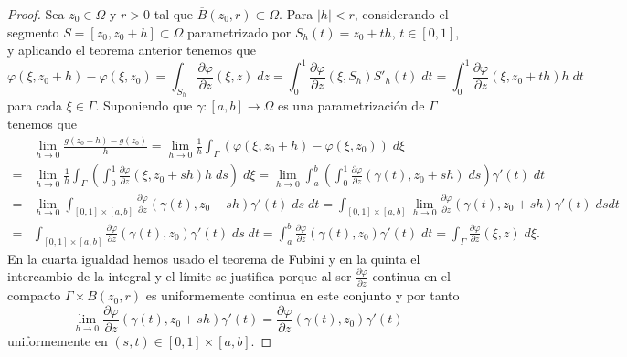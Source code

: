 \begin{proof}
	Sea $\displaystyle z_{0} \in \Omega  $ y $\displaystyle r > 0 $ tal que $\displaystyle \overline{B}\left(z_{0}, r\right)\subset \Omega  $. Para $\displaystyle \left|h\right|<r $, considerando el segmento $\displaystyle S = \left[z_{0}, z_{0} + h\right] \subset \Omega  $ parametrizado por $\displaystyle S_{h}\left(t\right)=z_{0} + th $, $\displaystyle t \in \left[0,1\right]  $, y aplicando el teorema anterior tenemos que 
	\[\varphi\left(\xi, z_{0} + h\right)-\varphi\left(\xi, z_{0}\right)=\int _{S_{h}}\frac{\partial\varphi}{\partial z}\left(\xi, z\right) \; dz = \int^{1}_{0} \frac{\partial \varphi}{\partial z}\left(\xi, S_{h}\right)S'_{h}\left(t\right) \; dt = \int^{1}_{0} \frac{\partial\varphi}{\partial z}\left(\xi,z_{0}+th\right)h \; dt \]
	para cada $\displaystyle \xi \in \Gamma $. Suponiendo que $\displaystyle \gamma : \left[a,b\right] \to \Omega  $ es una parametrización de $\displaystyle \Gamma $ tenemos que
	\[
	\begin{split}
		&\lim_{h \to 0}\frac{g\left(z_{0} + h\right)-g\left(z_{0}\right)}{h} =  \lim_{h \to 0}\frac{1}{h}\int _{\Gamma}\left(\varphi\left(\xi, z_{0} + h\right)-\varphi\left(\xi, z_{0}\right)\right) \; d\xi \\
		= &  \lim_{h \to 0}\frac{1}{h}\int _{\Gamma }\left(\int^{1}_{0} \frac{\partial\varphi}{\partial z}\left(\xi, z_{0} + sh\right)h \; d s\right) \; d\xi 
		=  \lim_{h \to 0}\int^{b}_{a} \left(\int^{1}_{0} \frac{\partial \varphi}{\partial z}\left(\gamma\left(t\right), z_{0} + sh\right) \; d s\right)\gamma'\left(t\right) \; dt \\
		= &  \lim_{h \to 0}\int _{\left[0,1\right] \times\left[a,b\right] }\frac{\partial \varphi}{\partial z}\left(\gamma\left(t\right), z_{0} + sh\right)\gamma'\left(t\right) \; d s \; dt  = \int _{\left[0,1\right] \times\left[a,b\right] }\lim_{h \to 0}\frac{\partial \varphi}{\partial z}\left(\gamma \left(t\right), z_{0} + sh\right)\gamma'\left(t\right) \; d s dt\\
		= & \int _{\left[0,1\right] \times\left[a,b\right] }\frac{\partial \varphi}{\partial z}\left(\gamma\left(t\right), z_{0}\right)\gamma'\left(t\right) \; d s \; dt = \int^{b}_{a} \frac{\partial \varphi}{\partial z}\left(\gamma\left(t\right), z_{0}\right)\gamma'\left(t\right) \; dt = \int _{\Gamma}\frac{\partial \varphi}{\partial z}\left(\xi, z\right) \; d\xi.
	\end{split}
	\]
En la cuarta igualdad hemos usado el teorema de Fubini y en la quinta el intercambio de la integral y el límite se justifica porque al ser $\displaystyle \frac{\partial \varphi}{\partial z} $ continua en el compacto $\displaystyle \Gamma \times \overline{B}\left(z_{0}, r\right) $ es uniformemente continua en este conjunto y por tanto
\[\lim_{h \to 0}\frac{\partial \varphi}{\partial z}\left(\gamma\left(t\right), z_{0} + sh\right)\gamma'\left(t\right)=\frac{\partial \varphi}{\partial z}\left(\gamma\left(t\right), z_{0}\right)\gamma'\left(t\right)\]
uniformemente en $\displaystyle \left(s,t\right)\in \left[0,1\right] \times\left[a,b\right]  $. 
\end{proof}

